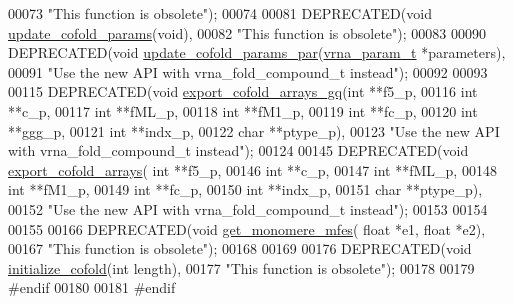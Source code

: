 \begin{DoxyCode}
00073           \textcolor{stringliteral}{"This function is obsolete"});
00074 
00081 DEPRECATED(\textcolor{keywordtype}{void} \hyperlink{group__mfe__global__deprecated_ga4fcbf34e77b99bfbb2333d2ab0c41a57}{update\_cofold\_params}(\textcolor{keywordtype}{void}),
00082           \textcolor{stringliteral}{"This function is obsolete"});
00083 
00090 DEPRECATED(\textcolor{keywordtype}{void} \hyperlink{group__mfe__global__deprecated_gaaadbd28b4e428710529ab4098fdacad3}{update\_cofold\_params\_par}(\hyperlink{group__energy__parameters_structvrna__param__s}{vrna\_param\_t} *parameters),
00091           \textcolor{stringliteral}{"Use the new API with vrna\_fold\_compound\_t instead"});
00092 
00093 
00115 DEPRECATED(\textcolor{keywordtype}{void} \hyperlink{group__mfe__global__deprecated_ga5f5bf4df35d0554f6ace9579f8744c48}{export\_cofold\_arrays\_gq}(\textcolor{keywordtype}{int} **f5\_p,
00116                                         \textcolor{keywordtype}{int} **c\_p,
00117                                         \textcolor{keywordtype}{int} **fML\_p,
00118                                         \textcolor{keywordtype}{int} **fM1\_p,
00119                                         \textcolor{keywordtype}{int} **fc\_p,
00120                                         \textcolor{keywordtype}{int} **ggg\_p,
00121                                         \textcolor{keywordtype}{int} **indx\_p,
00122                                         \textcolor{keywordtype}{char} **ptype\_p),
00123           \textcolor{stringliteral}{"Use the new API with vrna\_fold\_compound\_t instead"});
00124 
00145 DEPRECATED(\textcolor{keywordtype}{void} \hyperlink{group__mfe__global__deprecated_ga5cb6b59983f1f74ccc00b9b9c4e84482}{export\_cofold\_arrays}( \textcolor{keywordtype}{int} **f5\_p,
00146                                       \textcolor{keywordtype}{int} **c\_p,
00147                                       \textcolor{keywordtype}{int} **fML\_p,
00148                                       \textcolor{keywordtype}{int} **fM1\_p,
00149                                       \textcolor{keywordtype}{int} **fc\_p,
00150                                       \textcolor{keywordtype}{int} **indx\_p,
00151                                       \textcolor{keywordtype}{char} **ptype\_p),
00152           \textcolor{stringliteral}{"Use the new API with vrna\_fold\_compound\_t instead"});
00153 
00154 
00155 
00166 DEPRECATED(\textcolor{keywordtype}{void} \hyperlink{group__mfe__global__deprecated_ga4958b517c613e4d2afd5bce6c1060a79}{get\_monomere\_mfes}( \textcolor{keywordtype}{float} *e1, \textcolor{keywordtype}{float} *e2),
00167           \textcolor{stringliteral}{"This function is obsolete"});
00168 
00169 
00176 DEPRECATED(\textcolor{keywordtype}{void} \hyperlink{group__mfe__global__deprecated_gafee0c32208aa2ac97338b6e3fbad7fa5}{initialize\_cofold}(\textcolor{keywordtype}{int} length),
00177           \textcolor{stringliteral}{"This function is obsolete"});
00178 
00179 \textcolor{preprocessor}{#endif}
00180 
00181 \textcolor{preprocessor}{#endif}
\end{DoxyCode}
